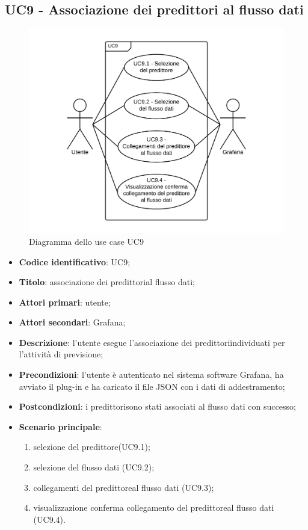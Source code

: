 \subsection{UC9 - Associazione dei predittori al flusso dati}
\begin{figure}[H]
\includegraphics{img/UC9_-_Associazione_dei_predittori_al_flusso_dati.png}
\caption{Diagramma dello use case UC9}
\end{figure}
\begin{itemize}
	\item \textbf{Codice identificativo}: UC9;
	\item \textbf{Titolo}: associazione dei predittori\glosp al flusso dati;
	\item \textbf{Attori primari}: utente;
	\item \textbf{Attori secondari}: Grafana\glo;
	\item \textbf{Descrizione}: l'utente esegue l'associazione dei predittori\glosp individuati per l'attività di previsione;
	\item \textbf{Precondizioni}: l'utente è autenticato nel sistema software Grafana\glo, ha avviato il plug-in e ha caricato il file JSON con i dati di addestramento;
	\item \textbf{Postcondizioni}: i predittori\glosp sono stati associati al flusso dati con successo;
	\item \textbf{Scenario principale}: 
		\begin{enumerate}
			\item selezione del predittore\glosp (UC9.1);
			\item selezione del flusso dati (UC9.2);
			\item collegamenti del predittore\glosp al flusso dati (UC9.3);
			\item visualizzazione conferma collegamento del predittore\glosp al flusso dati (UC9.4).
		\end{enumerate}
\end{itemize}

